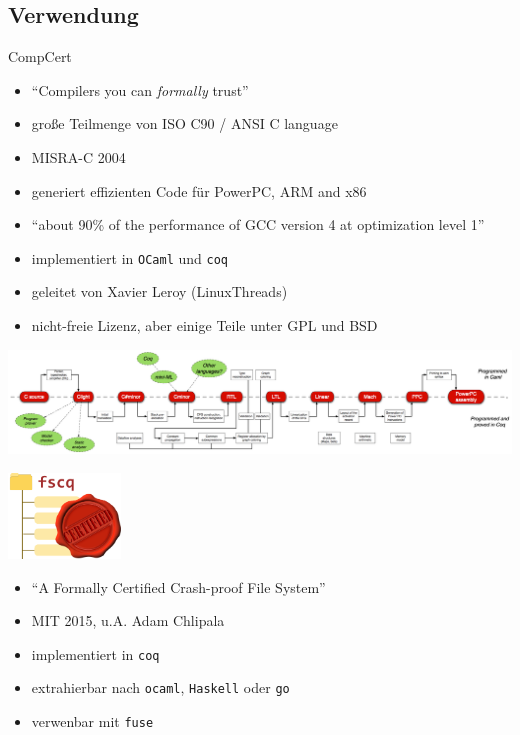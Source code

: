 \documentclass[aspectratio=169]{beamer}
\begin{document}
\subsection{Verwendung}
\begin{frame}
  \begin{center}
    \Large{CompCert}
  \end{center}
  \begin{itemize}
  \item ``Compilers you can \textit{formally} trust''
  \item große Teilmenge von ISO C90 / ANSI C language
  \item MISRA-C 2004
  \item generiert effizienten Code für PowerPC, ARM and x86
  \item ``about 90\% of the performance of GCC version 4 at optimization level 1''
  \item implementiert in \texttt{OCaml} und \texttt{coq}
  \item geleitet von Xavier Leroy (LinuxThreads) 
  \item nicht-freie Lizenz, aber einige Teile unter GPL und BSD
  \end{itemize}
\end{frame}
\begin{frame}
  \begin{center}
    \includegraphics[width=20.0cm]{compcert_diagram.png}
  \end{center}
\end{frame}
\begin{frame}
  \begin{center}
    \includegraphics[width=3.0cm]{fscq_logo.png}
  \end{center}
  \begin{itemize}
  \item ``A Formally Certified Crash-proof File System''
  \item MIT 2015, u.A. Adam Chlipala
  \item implementiert in \texttt{coq}
  \item extrahierbar nach \texttt{ocaml}, \texttt{Haskell} oder \texttt{go}
  \item verwenbar mit \texttt{fuse} 
  \end{itemize}
\end{frame}
\end{document}
